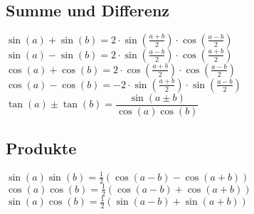 \\[10pt]
%
\begin{minipage}[t]{0.5\textwidth}
\subsection{Summe und Differenz}
	$\sin(a)+\sin(b)=2 \cdot \sin \left(\frac{a+b}{2}\right) \cdot
	\cos\left(\frac{a-b}{2}\right)$\\
	$\sin(a)-\sin(b)=2 \cdot \sin \left(\frac{a-b}{2}\right) \cdot \cos\left(\frac{a+b}{2}\right)$\\
	$\cos(a)+\cos(b)=2 \cdot \cos \left(\frac{a+b}{2}\right) \cdot
	\cos\left(\frac{a-b}{2}\right)$\\
	$\cos(a)-\cos(b)=-2 \cdot \sin \left(\frac{a+b}{2}\right) \cdot
	\sin\left(\frac{a-b}{2}\right)$\\
	$\tan(a) \pm \tan(b)=\dfrac{\sin(a \pm b)}{\cos(a)\cos(b)}$
\end{minipage}
%
\begin{minipage}[t]{0.5\textwidth}
\subsection{Produkte}
$\sin(a)\sin(b)=\frac{1}{2}(\cos(a-b)-\cos(a+b))$\\
$\cos(a)\cos(b)=\frac{1}{2}(\cos(a-b)+\cos(a+b))$\\
$\sin(a)\cos(b)=\frac{1}{2}(\sin(a-b)+\sin(a+b))$
\end{minipage}

%
